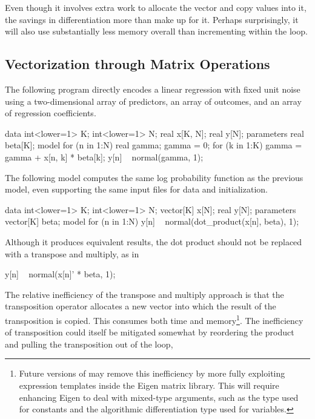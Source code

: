 Even though it involves extra work to allocate the 
vector and copy  values into it, the savings in
differentiation more than make up for it.  Perhaps surprisingly,
it will also use substantially less memory overall than incrementing
 within the loop.


\subsection{Vectorization through Matrix Operations}

The following program directly encodes a linear regression with fixed
unit noise using a two-dimensional array  of predictors, an
array  of outcomes, and an array  of regression
coefficients.
%
\begin{stancode}
data {
  int<lower=1> K;
  int<lower=1> N;
  real x[K, N];
  real y[N];
}
parameters {
  real beta[K];
}
model {
  for (n in 1:N) {
    real gamma;  
    gamma = 0;
    for (k in 1:K)
      gamma = gamma + x[n, k] * beta[k];
    y[n] ~ normal(gamma, 1);
  }
}
\end{stancode}
%
The following model computes the same log probability function as the
previous model, even supporting the same input files for data and
initialization.
%
\begin{stancode}
data {
  int<lower=1> K;
  int<lower=1> N;
  vector[K] x[N];
  real y[N];
}
parameters {
  vector[K] beta;
}
model {
  for (n in 1:N)
    y[n] ~ normal(dot_product(x[n], beta), 1);
}
\end{stancode}
%
Although it produces equivalent results, the dot product should not be
replaced with a transpose and multiply, as in
%
\begin{stancode}
        y[n] ~ normal(x[n]' * beta, 1);
\end{stancode}
%
The relative inefficiency of the transpose and multiply approach is
that the transposition operator allocates a new vector into which the
result of the transposition is copied.  This consumes both time
and memory\footnote{Future versions of \Stan may remove this inefficiency
by more fully exploiting expression templates inside the Eigen
\Cpp matrix library.  This will require enhancing Eigen to deal
with mixed-type arguments, such as the type  used
for constants and the algorithmic differentiation type
used for variables.}.
%
The inefficiency of transposition could itself be mitigated somewhat by
reordering the product and pulling the transposition out of the loop,
